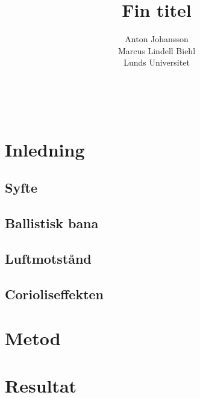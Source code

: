 \documentclass[a4paper]{article}
\title{Fin titel}
\author{Anton Johansson\\Marcus Lindell Biehl\\Lunds Universitet}
\makeatletter
\renewcommand*\maketitle{
  {
    \begin{center}
      {\huge\bfseries \@title}\\
      \vspace{5mm}
      {\large \@author}
    \end{center}
    \vspace{2mm}
  }
}
\makeatother
\begin{document}
\maketitle

\begin{abstract}
\end{abstract}

\vspace{2mm}

\section{Inledning}

\subsection{Syfte}

\subsection{Ballistisk bana}

\subsection{Luftmotstånd}

\subsection{Corioliseffekten}

\section{Metod}

\section{Resultat}
\end{document}
